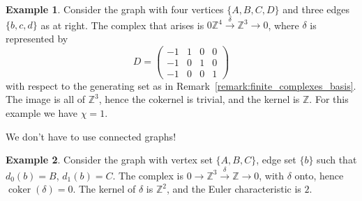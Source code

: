 \documentclass{tufte-handout}
\def\ZZ{\mathbb{Z}}
\DeclareMathOperator{\coker}{coker}
\theoremstyle{definition}
\newtheorem{example}{Example}
\begin{document}
\begin{example}\label{eg:triangle_graph}
Consider 
the graph with four vertices $\{A,B,C,D\}$ and three edges $\{b,c,d\}$ as at right. The complex that arises is $0\ZZ^4\xrightarrow{\delta} \ZZ^3 \to 0$, where $\delta$ is represented by
\[
	D = \begin{pmatrix}
		-1 & 1 & 0 & 0\\
		-1 & 0 & 1 & 0\\
		-1 & 0 & 0 & 1
	\end{pmatrix}
\]
with respect to the generating set as in Remark~\ref{remark:finite_complexes_basis}. The 
image is all of $\ZZ^3$, hence the cokernel is trivial, and the kernel is $\ZZ$. For 
this example we have $\chi = 1$.
\end{example}

We don't have to use connected graphs!

\begin{example}
Consider
the graph with vertex set $\{A,B,C\}$, edge set $\{b\}$ such that $d_0(b)=B$, 
 $d_1(b)=C$. The complex is $0\to \ZZ^3 \xrightarrow{\delta} \ZZ \to 0$, with 
 $\delta$ onto, hence $\coker(\delta)=0$. The kernel of $\delta$ is $\ZZ^2$, and the 
 Euler characteristic is $2$.

\end{example}
\end{document}
